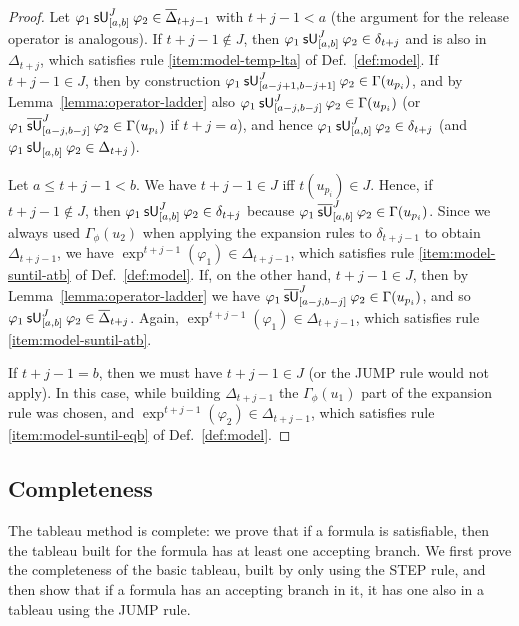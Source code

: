 \documentclass[acmsmall,screen]{acmart}
\begin{document}
\begin{proof}
Let $\suntil[J]{[a,b]}{\varphi_1}{\varphi_2} \in \overline{\Delta}_{t+j-1}$ with $t+j-1 < a$
(the argument for the release operator is analogous).
If $t+j-1 \not\in J$, then $\suntil[J]{[a,b]}{\varphi_1}{\varphi_2} \in \delta_{t+j}$ and is also in $\Delta_{t+j}$,
which satisfies rule \ref{item:model-temp-lta} of Def.~\ref{def:model}.
If $t+j-1 \in J$, then by construction
$\suntil[J]{[a-j+1,b-j+1]}{\varphi_1}{\varphi_2} \in \Gamma(u_{p_i})$,
and by Lemma~\ref{lemma:operator-ladder} also
$\suntil[J]{[a-j,b-j]}{\varphi_1}{\varphi_2} \in \Gamma(u_{p_i})$
(or $\msuntil[J]{[a-j,b-j]}{\varphi_1}{\varphi_2} \in \Gamma(u_{p_i})$ if $t+j = a$),
and hence $\suntil[J]{[a,b]}{\varphi_1}{\varphi_2} \in \delta_{t+j}$
(and $\suntil{[a,b]}{\varphi_1}{\varphi_2} \in \Delta_{t+j}$).

Let $a \leq t+j-1 < b$.
We have $t+j-1 \in J$ iff $t(u_{p_i}) \in J$.
Hence, if $t+j-1 \not\in J$, then $\suntil[J]{[a,b]}{\varphi_1}{\varphi_2} \in \delta_{t+j}$
because $\msuntil[J]{[a,b]}{\varphi_1}{\varphi_2} \in \Gamma(u_{p_i})$.
Since we always used $\Gamma_\phi(u_2)$ when applying the expansion rules to $\delta_{t+j-1}$ to obtain $\Delta_{t+j-1}$,
we have $\exp^{t+j-1}(\varphi_1) \in \Delta_{t+j-1}$, which satisfies rule \ref{item:model-suntil-atb} of Def.~\ref{def:model}.
If, on the other hand, $t+j-1 \in J$, then by Lemma~\ref{lemma:operator-ladder}
we have $\msuntil[J]{[a-j,b-j]}{\varphi_1}{\varphi_2} \in \Gamma(u_{p_i})$,
and so $\suntil[J]{[a,b]}{\varphi_1}{\varphi_2} \in \overline{\Delta}_{t+j}$.
Again, $\exp^{t+j-1}(\varphi_1) \in \Delta_{t+j-1}$, which satisfies rule \ref{item:model-suntil-atb}.

If $t+j-1 = b$, then we must have $t+j-1 \in J$ (or the \textsf{JUMP} rule would not apply).
In this case, while building $\Delta_{t+j-1}$ the $\Gamma_\phi(u_1)$ part of the expansion rule was chosen,
and $\exp^{t+j-1}(\varphi_2) \in \Delta_{t+j-1}$,
which satisfies rule \ref{item:model-suntil-eqb} of Def.~\ref{def:model}.
\end{proof}


\subsection{Completeness}
The tableau method is complete: we prove that if a formula is satisfiable,
then the tableau built for the formula has at least one accepting branch.
We first prove the completeness of the basic tableau, built by only using the \textsf{STEP} rule,
and then show that if a formula has an accepting branch in it,
it has one also in a tableau using the \textsf{JUMP} rule.
\end{document}
